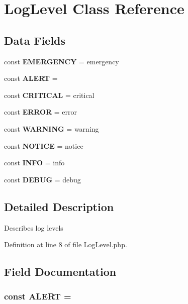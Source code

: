 \section{Log\+Level Class Reference}
\label{class_psr_1_1_log_1_1_log_level}
\subsection*{Data Fields}
\begin{DoxyCompactItemize}
\item 
const {\bf E\+M\+E\+R\+G\+E\+N\+C\+Y} = \textquotesingle{}emergency\textquotesingle{}
\item 
const {\bf A\+L\+E\+R\+T} = \textquotesingle{}
\item 
const {\bf C\+R\+I\+T\+I\+C\+A\+L} = \textquotesingle{}critical\textquotesingle{}
\item 
const {\bf E\+R\+R\+O\+R} = \textquotesingle{}error\textquotesingle{}
\item 
const {\bf W\+A\+R\+N\+I\+N\+G} = \textquotesingle{}warning\textquotesingle{}
\item 
const {\bf N\+O\+T\+I\+C\+E} = \textquotesingle{}notice\textquotesingle{}
\item 
const {\bf I\+N\+F\+O} = \textquotesingle{}info\textquotesingle{}
\item 
const {\bf D\+E\+B\+U\+G} = \textquotesingle{}debug\textquotesingle{}
\end{DoxyCompactItemize}


\subsection{Detailed Description}
Describes log levels 

Definition at line 8 of file Log\+Level.\+php.



\subsection{Field Documentation}
\subsubsection[{A\+L\+E\+R\+T}]{\setlength{\rightskip}{0pt plus 5cm}const A\+L\+E\+R\+T = \textquotesingle{}}\label{class_psr_1_1_log_1_1_log_level_a037a7f6e892e6adb07c2aa099fbaf69d}


